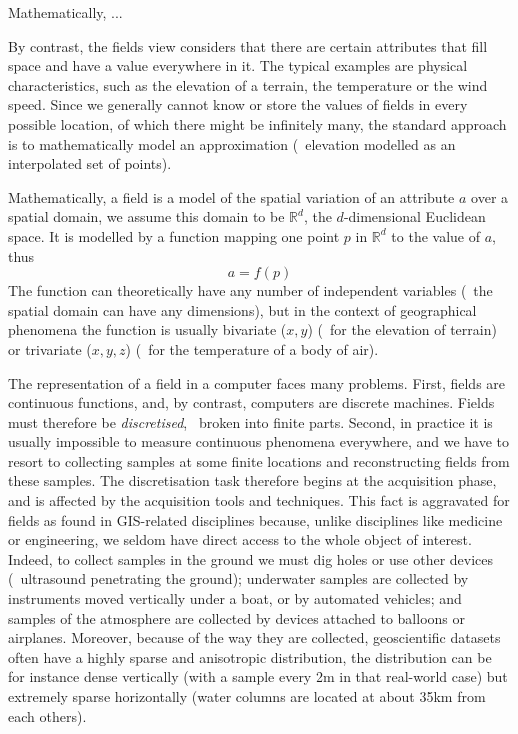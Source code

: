 Mathematically, ...

By contrast, the fields view considers that there are certain attributes that fill space and have a value everywhere in it.
The typical examples are physical characteristics, such as the elevation of a terrain, the temperature or the wind speed.
Since we generally cannot know or store the values of fields in every possible location, of which there might be infinitely many, the standard approach is to mathematically model an approximation (\eg\ elevation modelled as an interpolated set of points).

Mathematically, a field is a model of the spatial variation of an attribute $a$ over a spatial domain, we assume this domain to be $\mathbb{R}^d$, the $d$-dimensional Euclidean space.
It is modelled by a function mapping one point $p$ in $\mathbb{R}^d$ to the value of $a$, thus 
\[
  a = f(p)
\]
The function can theoretically have any number of independent variables (\ie\ the spatial domain can have any dimensions), but in the context of geographical phenomena the function is usually bivariate ($x,y$) (\eg\ for the elevation of terrain) or trivariate ($x,y,z$) (\eg\ for the temperature of a body of air).

%

The representation of a field in a computer faces many problems. 
First, fields are continuous functions, and, by contrast, computers are discrete machines. 
Fields must therefore be \emph{discretised}, \ie\ broken into finite parts.
Second, in practice it is usually impossible to measure continuous phenomena everywhere, and we have to resort to collecting samples at some finite locations and reconstructing fields from these samples.
The discretisation task therefore begins at the acquisition phase, and is affected by the acquisition tools and techniques.
This fact is aggravated for fields as found in GIS-related disciplines because, unlike disciplines like medicine or engineering, we seldom have direct access to the whole object of interest.
Indeed, to collect samples in the ground we must dig holes or use other devices (\eg\ ultrasound penetrating the ground); underwater samples are collected by instruments moved vertically under a boat, or by automated vehicles; and samples of the atmosphere are collected by devices attached to balloons or airplanes. 
Moreover, because of the way they are collected, geoscientific datasets often have a highly sparse and anisotropic distribution, the distribution can be for instance dense vertically (with a sample every 2m in that real-world case) but extremely sparse horizontally (water columns are located at about 35km from each others).

